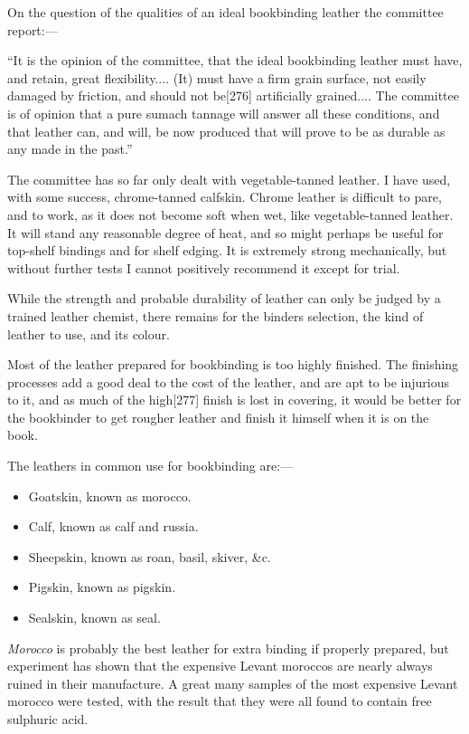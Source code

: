 \documentclass[
]{article}
\providecommand{\tightlist}{%
  \setlength{\itemsep}{0pt}\setlength{\parskip}{0pt}}
\begin{document}
On the question of the qualities of an ideal bookbinding leather the
committee report:---

``It is the opinion of the committee, that the ideal bookbinding leather
must have, and retain, great flexibility.... (It) must have a firm grain
surface, not easily damaged by friction, and should not
be{\protect\hypertarget{Page_276}{}{{[}276{]}}} artificially grained....
The committee is of opinion that a pure sumach tannage will answer all
these conditions, and that leather can, and will, be now produced that
will prove to be as durable as any made in the past.''

The committee has so far only dealt with vegetable-tanned leather. I
have used, with some success, chrome-tanned calfskin. Chrome leather is
difficult to pare, and to work, as it does not become soft when wet,
like vegetable-tanned leather. It will stand any reasonable degree of
heat, and so might perhaps be useful for top-shelf bindings and for
shelf edging. It is extremely strong mechanically, but without further
tests I cannot positively recommend it except for trial.

While the strength and probable durability of leather can only be judged
by a trained leather chemist, there remains for the binders selection,
the kind of leather to use, and its colour.

Most of the leather prepared for bookbinding is too highly finished. The
finishing processes add a good deal to the cost of the leather, and are
apt to be injurious to it, and as much of the
high{\protect\hypertarget{Page_277}{}{{[}277{]}}} finish is lost in
covering, it would be better for the bookbinder to get rougher leather
and finish it himself when it is on the book.

The leathers in common use for bookbinding are:---

\begin{itemize}
\tightlist
\item
  Goatskin, known as morocco.
\item
  Calf, known as calf and russia.
\item
  Sheepskin, known as roan, basil, skiver, \&c.
\item
  Pigskin, known as pigskin.
\item
  Sealskin, known as seal.
\end{itemize}

\emph{Morocco} is probably the best leather for extra binding if
properly prepared, but experiment has shown that the expensive Levant
moroccos are nearly always ruined in their manufacture. A great many
samples of the most expensive Levant morocco were tested, with the
result that they were all found to contain free sulphuric acid.
\end{document}
